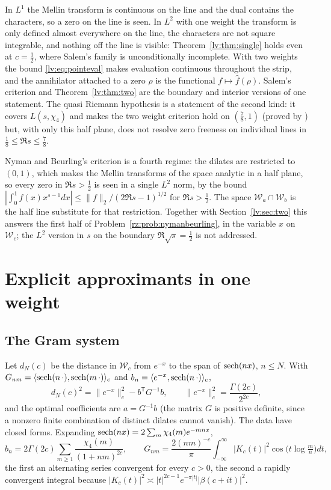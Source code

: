 In $L^1$ the Mellin transform is continuous on the line and the dual contains the characters, so a zero on the line is seen. In $L^2$ with one weight the transform is only defined almost everywhere on the line, the characters are not square integrable, and nothing off the line is visible: Theorem~\ref{lv:thm:single} holds even at $c=\frac12$, where Salem's family is unconditionally incomplete. With two weights the bound \eqref{lv:eq:pointeval} makes evaluation continuous throughout the strip, and the annihilator attached to a zero $\rho$ is the functional $f\mapsto\widehat f(\rho)$. Salem's criterion and Theorem~\ref{lv:thm:two} are the boundary and interior versions of one statement. The quasi Riemann hypothesis is a statement of the second kind: it covers $L(s,\chi_4)$ and makes the two weight criterion hold on $(\frac78,1)$ (proved by \cite{OAI26a}) but, with only this half plane, does not resolve zero freeness on individual lines in $\frac18\le\Re s\le\frac78$.

\begin{remark}
Nyman and Beurling's criterion is a fourth regime: the dilates are restricted to $(0,1)$, which makes the Mellin transforms of the space analytic in a half plane, so every zero in $\Re s>\frac12$ is seen in a single $L^2$ norm, by the bound $|\int_0^1f(x)x^{s-1}dx|\le\|f\|_2/(2\Re s-1)^{1/2}$ for $\Re s>\frac12$. The space $\mathcal W_a\cap\mathcal W_b$ is the half line substitute for that restriction. Together with Section~\ref{lv:sec:two} this answers the first half of Problem~\ref{rz:prob:nymanbeurling}, in the variable $x$ on $\mathcal W_c$; the $L^2$ version in $s$ on the boundary $\Re\sqrt s=\frac12$ is not addressed.
\end{remark}

\section{Explicit approximants in one weight}\label{lv:sec:gram}

\subsection{The Gram system}

Let $d_N(c)$ be the distance in $\mathcal W_c$ from $e^{-x}$ to the span of $\operatorname{sech}(nx)$, $n\le N$. With $G_{nm}=\langle\operatorname{sech}(n\,\cdot),\operatorname{sech}(m\,\cdot)\rangle_c$ and $b_n=\langle e^{-x},\operatorname{sech}(n\,\cdot)\rangle_c$,
\begin{equation}\label{lv:eq:gram}
d_N(c)^2=\|e^{-x}\|_c^2-b^{\mathsf T}G^{-1}b,\qquad\|e^{-x}\|_c^2=\frac{\Gamma(2c)}{2^{2c}},
\end{equation}
and the optimal coefficients are $a=G^{-1}b$ (the matrix $G$ is positive definite, since a nonzero finite combination of distinct dilates cannot vanish). The data have closed forms. Expanding $\operatorname{sech}(nx)=2\sum_m\chi_4(m)e^{-mnx}$,
\[
b_n=2\Gamma(2c)\sum_{m\ge1}\frac{\chi_4(m)}{(1+nm)^{2c}},\qquad G_{nm}=\frac{2(nm)^{-c}}{\pi}\int_{-\infty}^\infty|K_c(t)|^2\cos\bigl(t\log\tfrac mn\bigr)dt,
\]
the first an alternating series convergent for every $c>0$, the second a rapidly convergent integral because $|K_c(t)|^2\asymp|t|^{2c-1}e^{-\pi|t|}|\beta(c+it)|^2$.

